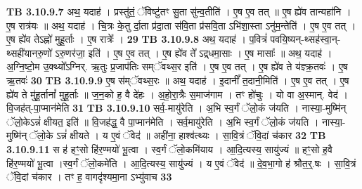 \documentclass[17pt]{extarticle}
\begin{document}
{{{{{{{{{{{{{{{{{{{{{{                  \newline
                                \textbf{ TB 3.10.9.7} \newline
                  अथ॒ यदाह॑ । प्रस्तु॑तं॒ ॅविष्टु॑तꣳ सु॒ता सु॑न्व॒तीति॑ । ए॒ष ए॒व तत् ॥ ए॒ष ह्ये॑व तान्यहा॑नि । ए॒ष रात्र॑यः ॥ अथ॒ यदाह॑ । चि॒त्रः के॒तु र्दा॒ता प्र॑दा॒ता स॑वि॒ता प्र॑सवि॒ता ऽभि॑शा॒स्ता ऽनु॑म॒न्तेति॑ । ए॒ष ए॒व तत् । ए॒ष ह्ये॑व तेऽह्नो॑ मुहू॒र्ताः । ए॒ष रात्रेः᳚ । \textbf{ 29} \newline
                  \newline
                                \textbf{ TB 3.10.9.8} \newline
                  अथ॒ यदाह॑ । प॒वित्रं॑ पवयि॒ष्यन्-थ्सह॑स्वा॒न्-थ्सही॑यानरु॒णो॑ ऽरु॒णर॑जा॒ इति॑ । ए॒ष ए॒व तत् । ए॒ष ह्ये॑व ते᳚ ऽद्र्धमा॒साः । ए॒ष मासाः᳚ ॥ अथ॒ यदाह॑ । अ॒ग्नि॒ष्टो॒म उ॒क्थ्यो᳚ऽग्निर्. ऋ॒तुः प्र॒जाप॑तिः सम्ॅवथ्स॒र इति॑ । ए॒ष ए॒व तत् । ए॒ष ह्ये॑व ते य॑ज्ञ्क्र॒तवः॑ । ए॒ष ऋ॒तवः॑ \textbf{ 30} \newline
                  \newline
                                \textbf{ TB 3.10.9.9} \newline
                  ए॒ष स॑म्ॅवथ्स॒रः ॥ अथ॒ यदाह॑ । इ॒दानीं᳚ त॒दानी॒मिति॑ । ए॒ष ए॒व तत् । ए॒ष ह्ये॑व ते मु॑हू॒र्तानां᳚ मुहू॒र्ताः ॥ ज॒न॒को ह॒ वै दे॑हः । अ॒हो॒रा॒त्रैः स॒माज॑गाम । तꣳ हो॑चुः । यो वा अ॒स्मान्. वेद॑ । वि॒जह॑त्-पा॒प्मान॑मेति \textbf{ 31} \newline
                  \newline
                                \textbf{ TB 3.10.9.10} \newline
                  सर्व॒-मायु॑रेति । अ॒भि स्व॒र्गं ॅलो॒कं ज॑यति । नास्या॒-मुष्मि॑न् ॅलो॒केऽन्नं॑ क्षीयत॒ इति॑ ॥ वि॒जह॑द्ध॒ वै पा॒प्मान॑मेति । सर्व॒मायु॑रेति । अ॒भि स्व॒र्गं ॅलो॒कं ज॑यति । नास्या॒-मुष्मि॑न् ॅलो॒के ऽन्नं॑ क्षीयते । य ए॒वं ॅवेद॑ ॥ अही॑ना॒ हाश्व॑त्थ्यः । सा॒वि॒त्रं ॅवि॒दां च॑कार \textbf{ 32} \newline
                  \newline
                                \textbf{ TB 3.10.9.11} \newline
                  स ह॑ हꣳ॒॒सो हि॑र॒ण्मयो॑ भू॒त्वा । स्व॒र्गं ॅलो॒कमि॑याय । आ॒दि॒त्यस्य॒ सायु॑ज्यं ॥ हꣳ॒॒सो ह॒वै हि॑र॒ण्मयो॑ भू॒त्वा ।स्व॒र्गं ॅलो॒कमे॑ति । आ॒दि॒त्यस्य॒ सायु॑ज्यं । य ए॒वं ॅवेद॑ ॥ दे॒व॒भा॒गो ह॑ श्रौत॒र्॒.षः । सा॒वि॒त्रं ॅवि॒दां च॑कार । तꣳ ह॒ वागदृ॑श्यमा॒ना ऽभ्यु॑वाच \textbf{ 33} \newline
                  \newline
}}}}}}}}}}}}}}}}}}}}}}
\end{document}
